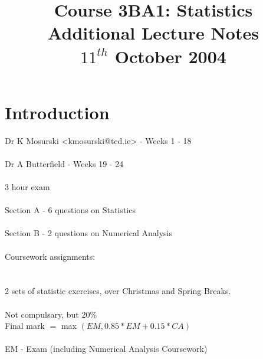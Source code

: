 \documentclass[a4paper,12pt]{article}
\begin{document}
\title{Course 3BA1: Statistics \\ Additional Lecture Notes \\ $11^{th}$ October 2004}

\maketitle

\section{Introduction}

Dr K Mosurski <kmosurski@tcd.ie> - Weeks 1 - 18 \\

\\

Dr A Butterfield - Weeks 19 - 24 \\

\\

3 hour exam \\

\\

Section A - 6 questions on Statistics \\

\\

Section B - 2 questions on Numerical Analysis \\

\\

Coursework assignments: \\

\\

\\

2 sets of statistic exercises, over Christmas and Spring Breaks. \\

\\

Not compulsary, but 20\% \\

Final mark $ = $ max $ \left( EM, 0.85 * EM + 0.15 * CA \right) $ \\

\\

EM - Exam (including Numerical Analysis Coursework) \\
\end{document}
